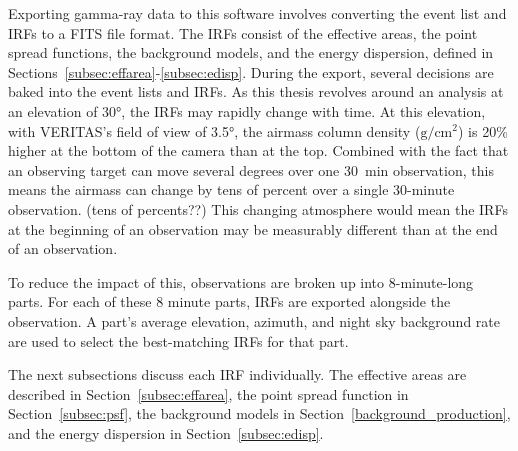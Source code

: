Exporting gamma-ray data to this software involves converting the event list and IRFs to a FITS file format.
The IRFs consist of the effective areas, the point spread functions, the background models, and the energy dispersion, defined in Sections~\ref{subsec:effarea}-\ref{subsec:edisp}.
During the export, several decisions are baked into the event lists and IRFs.
As this thesis revolves around an analysis at an elevation of \nicetilde{}\ang{30}, the IRFs may rapidly change with time.
At this elevation, with VERITAS's field of view of \ang{3.5}, the airmass column density ($\textrm{g}/\textrm{cm}^2$) is 20\% higher at the bottom of the camera than at the top.
Combined with the fact that an observing target can move several degrees over one \SI{30}{min} observation, this means the airmass can change by tens of percent over a single 30-minute observation.
{\color{red}(tens of percents??)}
This changing atmosphere would mean the IRFs at the beginning of an observation may be measurably different than at the end of an observation.

To reduce the impact of this, observations are broken up into 8-minute-long parts.
For each of these 8 minute parts, IRFs are exported alongside the observation.
A part's average elevation, azimuth, and night sky background rate are used to select the best-matching IRFs for that part.

The next subsections discuss each IRF individually.
The effective areas are described in Section~\ref{subsec:effarea}, the point spread function in Section~\ref{subsec:psf}, the background models in Section~\ref{background_production}, and the energy dispersion in Section~\ref{subsec:edisp}.

\FloatBarrier
  
